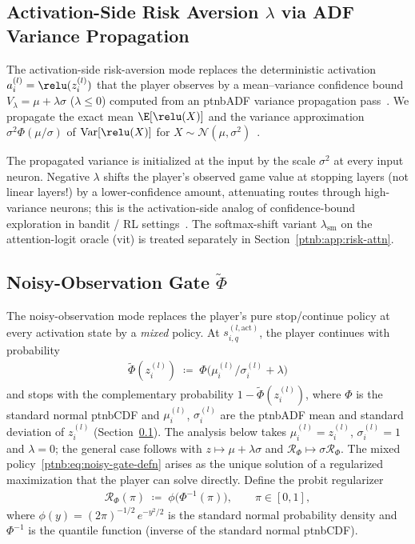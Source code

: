 \subsection{Activation-Side Risk Aversion \texorpdfstring{$\lambda$}{lambda} via ADF Variance Propagation}\label{ptnb:app:adf-variance}

The activation-side risk-aversion mode replaces the deterministic activation $a_i^{(l)} =
    \relu(z_i^{(l)})$ that the player observes by a mean--variance confidence bound $V_\lambda = \mu +
    \lambda\sigma$ ($\lambda \le 0$) computed from an \ac{ptnbADF} variance propagation
pass~\parencite{gast2018lightweight}. We propagate the exact mean $\E[\relu(X)]$ and the variance
approximation $\sigma^2\Phi(\mu/\sigma)$ of $\mathrm{Var}[\relu(X)]$ for $X \sim \mathcal{N}(\mu,
    \sigma^2)$~\parencite{gast2018lightweight}.

The propagated variance is initialized at the input by the scale $\sigma^2$ at every input neuron.
Negative $\lambda$ shifts the player's observed game value at stopping layers (not linear layers!)
by a lower-confidence amount, attenuating routes through high-variance neurons; this is the
activation-side analog of confidence-bound exploration in bandit / RL
settings~\parencite{auer2002finite,zhang2021risk}. The softmax-shift variant $\lambda_{\mathrm{sm}}$
on the attention-logit oracle (\acs{vit}) is treated separately in Section~\ref{ptnb:app:risk-attn}.

\subsection{Noisy-Observation Gate \texorpdfstring{$\tilde\Phi$}{Phi}}\label{ptnb:app:noisy-gate-mode}

The noisy-observation mode replaces the player's pure stop/continue policy at every activation
state by a \emph{mixed} policy. At $s_{i,q}^{(l, \text{act})}$, the player continues with
probability
\begin{align}\label{ptnb:eq:noisy-gate-defn}
    \tilde\Phi(z_i^{(l)}) \;\coloneqq\; \Phi\bigl(\mu_i^{(l)}/\sigma_i^{(l)} + \lambda\bigr)
\end{align}
and stops with the complementary probability $1 - \tilde\Phi(z_i^{(l)})$, where $\Phi$ is the
standard normal \ac{ptnbCDF} and $\mu_i^{(l)}$, $\sigma_i^{(l)}$ are the \ac{ptnbADF} mean and standard
deviation of $z_i^{(l)}$ (Section~\ref{ptnb:app:adf-variance}). The analysis below takes
$\mu_i^{(l)}=z_i^{(l)}$, $\sigma_i^{(l)}=1$ and $\lambda=0$; the general case follows with $z
    \mapsto \mu+\lambda\sigma$ and $\mathcal{R}_\Phi \mapsto \sigma\mathcal{R}_\Phi$. The mixed
policy~\eqref{ptnb:eq:noisy-gate-defn} arises as the unique solution of a regularized maximization that
the player can solve directly. Define the probit regularizer
\begin{align}\label{ptnb:eq:noisy-gate-regulariser}
    \mathcal{R}_\Phi(\pi) \;\coloneqq\; \phi\!\bigl(\Phi^{-1}(\pi)\bigr),
    \qquad \pi \in [0,1],
\end{align}
where $\phi(y) = (2\pi)^{-1/2}\,e^{-y^2/2}$ is the standard normal probability density and
$\Phi^{-1}$ is the quantile function (inverse of the standard normal \ac{ptnbCDF}).

